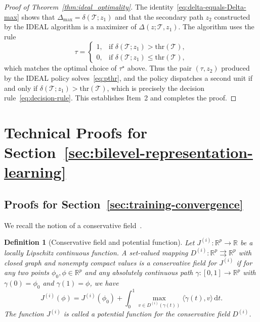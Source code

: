 \documentclass[11pt, letterpaper, oneside, reqno]{amsart}
\newcommand{\opt}{^\star}
\newcommand{\inner}[2]{\big \langle #1, #2 \big \rangle }
\newcommand{\R}{\mathbb{R}}
\newcommand{\dd}{\mathrm{d}}
\newtheorem{definition}{Definition}
\begin{document}
\begin{proof}[Proof of Theorem~\ref{thm:ideal_optimality}]
The identity~\eqref{eq:delta-equals-Delta-max} shows that $\Delta_{\max} = \delta(\mathcal T; z_1)$ and that the secondary path $z_2$ constructed by the IDEAL algorithm is a maximizer of $\Delta(z;\mathcal T,z_1)$. The algorithm uses the rule
\[
\tau =
\begin{cases}
1, & \text{if } \delta(\mathcal T; z_1) > \mathrm{thr}(\mathcal T),\\
0, & \text{if } \delta(\mathcal T; z_1) \le \mathrm{thr}(\mathcal T),
\end{cases}
\]
which matches the optimal choice of $\tau\opt$ above. Thus the pair $(\tau,z_2)$ produced by the IDEAL policy solves~\eqref{eq:pthr}, and the policy dispatches a second unit if and only if $\delta(\mathcal T; z_1) > \mathrm{thr}(\mathcal T)$, 
which is precisely the decision rule~\eqref{eq:decision-rule}. This establishes Item~2 and completes the proof.
\end{proof}


\section{Technical Proofs for Section~\ref{sec:bilevel-representation-learning}}\label{ec:proofs-bilevel-representation-learning}

\subsection{Proofs for Section~\ref{sec:training-convergence}}
\label{ec:training-convergence-proof}

We recall the notion of a conservative field~\cite[Definitions~1--2]{ref:bolte2021conservative}.

\begin{definition}[Conservative field and potential function]\label{def:conservative-field} 
Let $J^{(i)}: \R^p \to \R$ be a locally Lipschitz continuous function. A set-valued mapping $D^{(i)}: \R^p \rightrightarrows \R^p$ with closed graph and nonempty compact values is a \textit{conservative field} for $J^{(i)}$ if for any two points $\phi_0, \phi \in \R^p$ and any absolutely continuous path $\gamma: [0, 1] \to \R^p$ with $\gamma(0) = \phi_0$ and $\gamma(1) = \phi$, we have
\[
J^{(i)}(\phi) = J^{(i)}(\phi_0) + \int_0^1 \max_{v \in D^{(i)}(\gamma(t))} \inner{\dot{\gamma}(t)}{v} \, \dd t.
\]
The function $J^{(i)}$ is called a \textit{potential function} for the conservative field $D^{(i)}$.
\end{definition}
\end{document}

